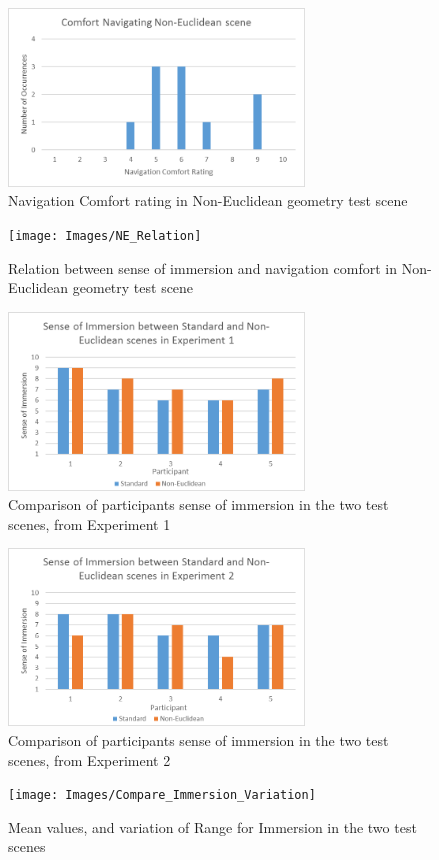 	\begin{figure}
		\label{exp:fig:ne_comfort}
		\includegraphics[width=0.7\textwidth]{Images/NE_Comfort}
		\centering
		\caption{Navigation Comfort rating in Non-Euclidean geometry test scene}
	\end{figure}

	\begin{figure}
		\label{exp:fig:ne_relation}
		\texttt{[image: Images/NE\_Relation]}
		\centering
		\caption{Relation between sense of immersion and navigation comfort in Non-Euclidean geometry test scene}
	\end{figure}

	\begin{figure}
		\label{exp:fig:compare_immersion_exp1}
		\includegraphics[width=0.7\textwidth]{Images/Compare_Immersion_Exp_1}
		\centering
		\caption{Comparison of participants sense of immersion in the two test scenes, from Experiment 1}
	\end{figure}

	\begin{figure}
		\label{exp:fig:compare_immersion_exp2}
		\includegraphics[width=0.7\textwidth]{Images/Compare_Immersion_Exp_2}
		\centering
		\caption{Comparison of participants sense of immersion in the two test scenes, from Experiment 2}
	\end{figure}

	\begin{figure}
		\label{exp:fig:compare_immersion_variation}
		\texttt{[image: Images/Compare\_Immersion\_Variation]}
		\centering
		\caption{Mean values, and variation of Range for Immersion in the two test scenes}
	\end{figure}

\begin{multicols*}{2}

\end{multicols*}